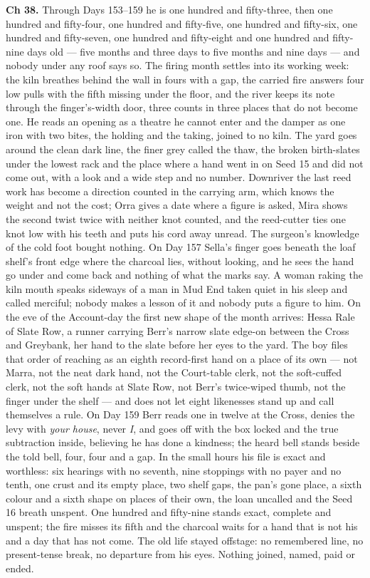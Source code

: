 \documentclass{design/chronicle}
\begin{document}
{\textbf{Ch 38.} Through Days 153–159 he is one hundred and fifty-three, then one hundred and fifty-four, one hundred and fifty-five, one hundred and fifty-six, one hundred and fifty-seven, one hundred and fifty-eight and one hundred and fifty-nine days old — five months and three days to five months and nine days — and nobody under any roof says so. The firing month settles into its working week: the kiln breathes behind the wall in fours with a gap, the carried fire answers four low pulls with the fifth missing under the floor, and the river keeps its note through the finger’s-width door, three counts in three places that do not become one. He reads an opening as a theatre he cannot enter and the damper as one iron with two bites, the holding and the taking, joined to no kiln. The yard goes around the clean dark line, the finer grey called the thaw, the broken birth-slates under the lowest rack and the place where a hand went in on Seed 15 and did not come out, with a look and a wide step and no number. Downriver the last reed work has become a direction counted in the carrying arm, which knows the weight and not the cost; Orra gives a date where a figure is asked, Mira shows the second twist twice with neither knot counted, and the reed-cutter ties one knot low with his teeth and puts his cord away unread. The surgeon’s knowledge of the cold foot bought nothing. On Day 157 Sella’s finger goes beneath the loaf shelf’s front edge where the charcoal lies, without looking, and he sees the hand go under and come back and nothing of what the marks say. A woman raking the kiln mouth speaks sideways of a man in Mud End taken quiet in his sleep and called merciful; nobody makes a lesson of it and nobody puts a figure to him. On the eve of the Account-day the first new shape of the month arrives: Hessa Rale of Slate Row, a runner carrying Berr’s narrow slate edge-on between the Cross and Greybank, her hand to the slate before her eyes to the yard. The boy files that order of reaching as an eighth record-first hand on a place of its own — not Marra, not the neat dark hand, not the Court-table clerk, not the soft-cuffed clerk, not the soft hands at Slate Row, not Berr’s twice-wiped thumb, not the finger under the shelf — and does not let eight likenesses stand up and call themselves a rule. On Day 159 Berr reads one in twelve at the Cross, denies the levy with \emph{your house}, never \emph{I}, and goes off with the box locked and the true subtraction inside, believing he has done a kindness; the heard bell stands beside the told bell, four, four and a gap. In the small hours his file is exact and worthless: six hearings with no seventh, nine stoppings with no payer and no tenth, one crust and its empty place, two shelf gaps, the pan’s gone place, a sixth colour and a sixth shape on places of their own, the loan uncalled and the Seed 16 breath unspent. One hundred and fifty-nine stands exact, complete and unspent; the fire misses its fifth and the charcoal waits for a hand that is not his and a day that has not come. The old life stayed offstage: no remembered line, no present-tense break, no departure from his eyes. Nothing joined, named, paid or ended.

}
\end{document}
